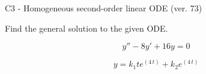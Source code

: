 \begin{exercise}
  \begin{exerciseTitle}C3 - Homogeneous second-order linear ODE (ver. 73)\end{exerciseTitle}
  \begin{exerciseStatement}
    
Find the general solution to the given ODE.

    
\[y''-8y'+16y = 0\]

  \end{exerciseStatement}
  \begin{exerciseAnswer}
    
\[y= k_{1} t e^{\left(4 \, t\right)} + k_{2} e^{\left(4 \, t\right)}\]

  \end{exerciseAnswer}
\end{exercise}